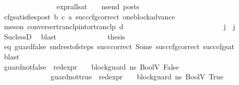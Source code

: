 \begin{isabellebody}
\ \ \ \ \ \ \ \ \ \ \ \ \ \ \isamarkupfalse%
\ {\isachardoublequoteopen}{\isacharparenleft}{\kern0pt}expr{\isacharunderscore}{\kern0pt}all{\isacharunderscore}{\kern0pt}sat\ {\isasymLambda}\ {\isasymGamma}\ {\isasymOmega}\ ns{\isacharunderscore}{\kern0pt}end{\isacharparenright}{\kern0pt}\ posts{\isachardoublequoteclose}\ \isamarkupfalse%
\ cfg{\isacharunderscore}{\kern0pt}satisfies{\isacharunderscore}{\kern0pt}post\ b\ c\ a\ succ{\isacharunderscore}{\kern0pt}cfg{\isacharunderscore}{\kern0pt}correct\ one{\isacharunderscore}{\kern0pt}block{\isacharunderscore}{\kern0pt}advance\ \isanewline
\ \ \ \ \ \ \ \ \ \ \ \ \ \ \ \ \isamarkupfalse%
\ {\isacharparenleft}{\kern0pt}meson\ converse{\isacharunderscore}{\kern0pt}rtranclp{\isacharunderscore}{\kern0pt}into{\isacharunderscore}{\kern0pt}rtranclp\ d{\isacharparenright}{\kern0pt}\ \isanewline
\ \ \ \ \ \ \ \ \ \ \ \ \isamarkupfalse%
\isanewline
\isanewline
\ \ \ \ \ \ \ \ \ \ \ \ \isamarkupfalse%
\ {\isachardoublequoteopen}j{\isacharprime}{\kern0pt}\ {\isacharless}{\kern0pt}\ j{\isachardoublequoteclose}\ \isamarkupfalse%
\ {}\ \isamarkupfalse%
\ Suc{\isacharunderscore}{\kern0pt}lessD\ \isamarkupfalse%
\ blast\isanewline
\isanewline
\ \ \ \ \ \ \ \ \ \ \ \ \isamarkupfalse%
\ {\isacharquery}{\kern0pt}thesis\ \isamarkupfalse%
\ eq\ guard{\isacharunderscore}{\kern0pt}false\ snd{\isacharunderscore}{\kern0pt}rest{\isacharunderscore}{\kern0pt}of{\isacharunderscore}{\kern0pt}steps\ succ{\isacharunderscore}{\kern0pt}correct\ Some\ succ{\isacharunderscore}{\kern0pt}cfg{\isacharunderscore}{\kern0pt}correct\ succ{\isacharunderscore}{\kern0pt}cfg{\isacharunderscore}{\kern0pt}sat\ \isamarkupfalse%
\ blast\isanewline
\ \ \ \ \ \ \ \ \ \ \isamarkupfalse%
\isanewline
\ \ \ \ \ \ \ \ \ \ \ \ \isamarkupfalse%
\ guard{\isacharunderscore}{\kern0pt}not{\isacharunderscore}{\kern0pt}false{}{\isacharcolon}{\kern0pt}\ {\isachardoublequoteopen}{\isacharparenleft}{\kern0pt}{\isasymnot}\ {\isacharparenleft}{\kern0pt}red{\isacharunderscore}{\kern0pt}expr\ {\isasymLambda}\ {\isasymGamma}\ {\isasymOmega}\ block{\isacharunderscore}{\kern0pt}guard\ ns{}\ {\isacharparenleft}{\kern0pt}BoolV\ False{\isacharparenright}{\kern0pt}{\isacharparenright}{\kern0pt}{\isacharparenright}{\kern0pt}{\isachardoublequoteclose}\ \ \ \isanewline
\ \ \ \ \ \ \ \ \ \ \ \ \ \ guard{\isacharunderscore}{\kern0pt}not{\isacharunderscore}{\kern0pt}true{}{\isacharcolon}{\kern0pt}\ {\isachardoublequoteopen}{\isacharparenleft}{\kern0pt}{\isasymnot}\ {\isacharparenleft}{\kern0pt}red{\isacharunderscore}{\kern0pt}expr\ {\isasymLambda}\ {\isasymGamma}\ {\isasymOmega}\ block{\isacharunderscore}{\kern0pt}guard\ ns{}\ {\isacharparenleft}{\kern0pt}BoolV\ True{\isacharparenright}{\kern0pt}{\isacharparenright}{\kern0pt}{\isacharparenright}{\kern0pt}{\isachardoublequoteclose}\isanewline

\end{isabellebody}
